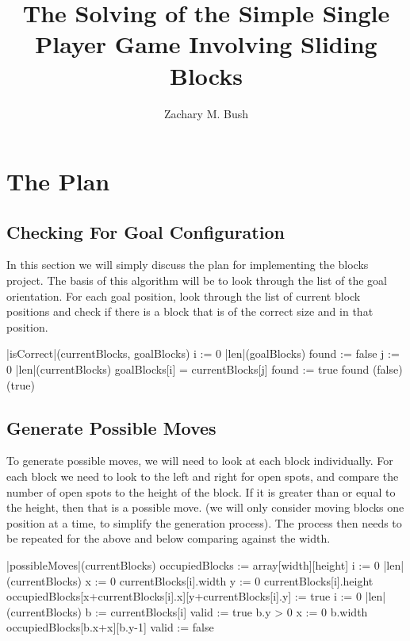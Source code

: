 \documentclass[a4paper]{article}
\begin{document}
\title{The Solving of the Simple Single Player Game Involving Sliding Blocks}
\author{Zachary M. Bush}
\maketitle
\tableofcontents
\lstlistoflistings
\section{The Plan}
\subsection{Checking For Goal Configuration}
In this section we will simply discuss the plan for implementing the blocks project. The basis of this algorithm will be to look through the list of the goal orientation. For each goal position, look through the list of current block positions and check if there is a block that is of the correct size and in that position. 
\begin{program}
\PROC |isCorrect|(currentBlocks, goalBlocks) \BODY
   \FOR i := 0 \TO |len|(goalBlocks) \DO
      found := false 
      \FOR j := 0 \TO |len|(currentBlocks) \DO
         \IF goalBlocks[i] = currentBlocks[j] \THEN found := true \FI
      \OD
      \IF \NOT found \THEN \EXIT(false) \FI {}
   \OD
\EXIT(true)\ENDPROC
\end{program}
\subsection{Generate Possible Moves}
To generate possible moves, we will need to look at each block individually. For each block we need to look to the left and right for open spots, and compare the number of open spots to the height of the block. If it is greater than or equal to the height, then that is a possible move. (we will only consider moving blocks one position at a time, to simplify the generation process). The process then needs to be repeated for the above and below comparing against the width. 
\begin{program}
\PROC |possibleMoves|(currentBlocks) \BODY
   occupiedBlocks := array[width][height]
   \FOR i := 0 \TO |len|(currentBlocks) \DO
      \FOR x := 0 \TO currentBlocks[i].width \DO
         \FOR y := 0 \TO currentBlocks[i].height \DO
            occupiedBlocks[x+currentBlocks[i].x][y+currentBlocks[i].y] := true
         \OD
      \OD
   \OD
   \FOR i := 0 \TO |len|(currentBlocks) \DO
      b := currentBlocks[i]
      valid := true 
      \IF b.y > 0 \THEN {}
         \FOR x := 0 \TO b.width \DO 
            \IF \NOT occupiedBlocks[b.x+x][b.y-1] \THEN 
               valid := false
               \EXIT
            \FI
         \OD
      \FI
   \OD\ENDPROC
\end{program}
\end{document}
